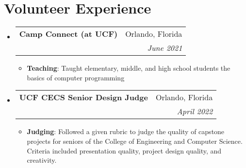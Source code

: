 \documentclass[a4paper,20pt]{article}
\makeatletter
\newcommand{\resumeItem}[2]{
  \item\small{
    \textbf{#1}{: #2 \vspace{-2pt}}
  }
}
\newcommand{\resumeSubheading}[4]{
  \vspace{-1pt}\item
    \begin{tabular*}{0.97\textwidth}{l@{\extracolsep{\fill}}r}
      \textbf{#1} & #2 \\
      \textit{#3} & \textit{#4} \\
    \end{tabular*}\vspace{-5pt}
}
\newcommand{\resumeSubHeadingListStart}{\begin{itemize}[leftmargin=*]}
\newcommand{\resumeSubHeadingListEnd}{\end{itemize}}
\newcommand{\resumeItemListStart}{\begin{itemize}}
\newcommand{\resumeItemListEnd}{\end{itemize}\vspace{-5pt}}
\makeatother
\begin{document}
\vspace{-5pt}
\section{Volunteer Experience}
\resumeSubHeadingListStart
\resumeSubheading
{Camp Connect (at UCF)}
{Orlando, Florida}
{}
{June 2021}
\resumeItemListStart
\resumeItem
{Teaching}
{Taught elementary, middle, and high school students the basics of computer programming}
\resumeItemListEnd


\vspace{2pt}
\resumeSubheading
{UCF CECS Senior Design Judge}
{Orlando, Florida}
{}
{April 2022}
\resumeItemListStart
\resumeItem
{Judging}
{Followed a given rubric to judge the quality of capstone projects for seniors of the College of Engineering and Computer Science.
  Criteria included presentation quality, project design quality, and creativity.}
\resumeItemListEnd

\resumeSubHeadingListEnd
\end{document}

